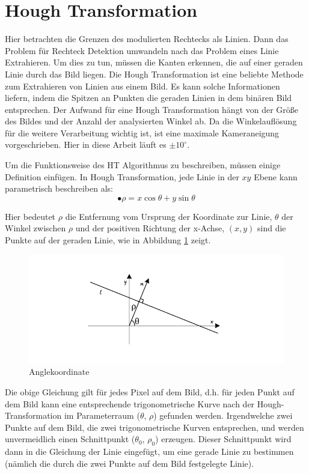 \section{Hough Transformation}

Hier betrachten die Grenzen des modulierten Rechtecks als Linien. Dann das Problem für Rechteck Detektion umwandeln nach das Problem eines Linie Extrahieren. Um dies zu tun, müssen die Kanten erkennen, die auf einer geraden Linie durch das Bild liegen. Die Hough Transformation ist eine beliebte Methode zum Extrahieren von Linien aus einem Bild. Es kann solche Informationen liefern, indem die Spitzen an Punkten die geraden Linien in dem binären Bild entsprechen. Der Aufwand für eine Hough Transformation hängt von der Größe des Bildes und der Anzahl der analysierten Winkel ab. Da die Winkelauflösung für die weitere Verarbeitung wichtig ist, ist eine maximale Kameraneigung vorgeschrieben. Hier in diese Arbeit läuft es $ \pm 10^{\circ} $.


Um die Funktionsweise des HT Algorithmus zu beschreiben, müssen einige Definition einfügen. In Hough Transformation, jede Linie in der $ xy $ Ebene kann parametrisch beschreiben als:
\begin{equation}
•  \rho = x \cos \theta + y \sin \theta
\end{equation} 

Hier bedeutet $ \rho $ die Entfernung vom Ursprung der Koordinate zur Linie, $ \theta $ der Winkel zwischen $ \rho $ und der positiven Richtung der x-Achse, $ (x,y) $ sind die Punkte auf der geraden Linie, wie in Abbildung \ref{fig:Hough} zeigt.

\begin{figure}[H]
 \centering 
  \includegraphics[keepaspectratio,width=1.0\textwidth]{images/4_ZweiteErfahrung/Hough/Hough.pdf}
 \caption{Anglekoordinate}
 \label{fig:Hough}
\end{figure}

Die obige Gleichung gilt für jedes Pixel auf dem Bild, d.h. für jeden Punkt auf dem Bild kann eine entsprechende trigonometrische Kurve nach der Hough-Transformation im Parameterraum ($ \theta $, $ \rho $) gefunden werden. Irgendwelche zwei Punkte auf dem Bild, die zwei  trigonometrische Kurven entsprechen, und werden unvermeidlich einen Schnittpunkt ($ \theta_0 $, $ \rho_0 $) erzeugen. Dieser Schnittpunkt wird dann in die Gleichung der Linie eingefügt, um eine gerade Linie zu bestimmen (nämlich die durch die zwei Punkte auf dem Bild festgelegte Linie). 


